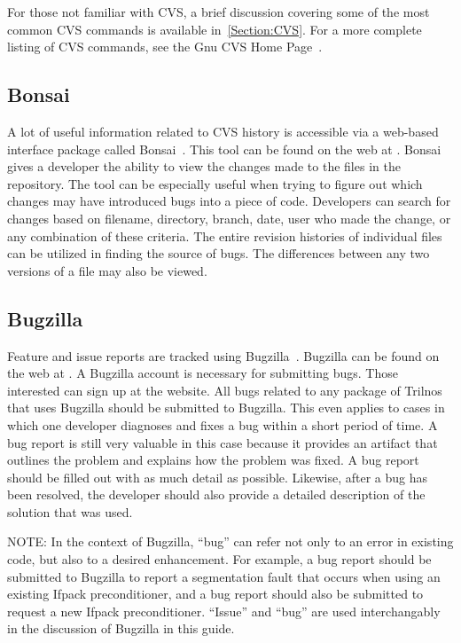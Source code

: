 \documentclass[12pt,strict]{TrilinosDevGuide}
\begin{document}
For those not familiar with CVS, a brief discussion covering some of the most 
common CVS commands is available in~\ref{Section:CVS}.  For a more complete 
listing of CVS commands, see the Gnu CVS Home Page~\cite{CVS}.

\subsection{Bonsai}
A lot of useful information related to CVS history is accessible via a
web-based interface package called Bonsai~\cite{Bonsai}.  This tool can be 
found on the web at 
\newline
{}.  Bonsai gives a 
developer the ability to view the changes made to the files in the 
repository.  The tool can be especially useful when trying to figure out which 
changes may have introduced bugs into a piece of code.  Developers can search 
for changes based on filename, directory, branch, date, user who made the 
change, or any combination of these criteria.  The entire revision histories of
individual files can be utilized in finding the source of 
bugs.  The differences between any two versions of a file may also be viewed.  

\subsection{Bugzilla}
\label{subsect:Bugzilla}
Feature and issue reports are tracked using Bugzilla~\cite{Bugzilla}.  
Bugzilla can be found on the web at 
.  
A Bugzilla account is necessary for submitting bugs.  Those interested can 
sign up at the website.  All bugs related to any package of Trilnos that uses 
Bugzilla should be submitted to Bugzilla.  This even applies to cases in which 
one developer diagnoses and fixes a bug within a short period of time.  A bug 
report is still very valuable in this case because it provides an artifact 
that outlines the problem and explains how the problem was fixed.  A bug 
report should be filled out with as much detail as possible.  Likewise, after 
a bug has been resolved, the developer should also provide a detailed 
description of the solution that was used.

NOTE: In the context of Bugzilla, ``bug'' can refer not only to an error in 
existing code, but also to a desired enhancement.  For example, a bug report 
should be submitted to Bugzilla to report a segmentation fault that occurs 
when using an existing Ifpack preconditioner, and a bug report should also be
submitted to request a new Ifpack preconditioner.  ``Issue'' and ``bug'' are 
used interchangably in the discussion of Bugzilla in this guide.
\end{document}

